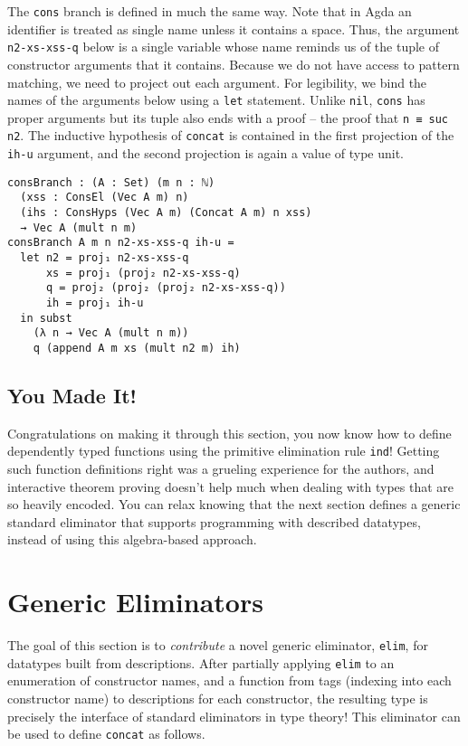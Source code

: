 \documentclass[preprint,nonatbib]{sigplanconf}
\begin{document}
The {\tt cons} branch is defined in much the same way. Note
that in {\sc Agda} an identifier is treated as single name unless it
contains a space. Thus, the argument {\tt n2-xs-xss-q} below is a
single variable whose name reminds us of the tuple of constructor
arguments that it contains. Because we do not have access to pattern
matching, we need to project out each argument. For legibility, we
bind the names of the arguments below using a {\tt let} statement.
Unlike {\tt nil}, {\tt cons} has proper arguments but its tuple also
ends with a proof -- the proof that {\tt n ≡ suc n2}. The inductive
hypothesis of {\tt concat} is contained in the first projection of the
{\tt ih-u} argument, and the second projection is again a value of
type unit.

\begin{verbatim}
consBranch : (A : Set) (m n : ℕ)
  (xss : ConsEl (Vec A m) n)
  (ihs : ConsHyps (Vec A m) (Concat A m) n xss)
  → Vec A (mult n m)
consBranch A m n n2-xs-xss-q ih-u =
  let n2 = proj₁ n2-xs-xss-q
      xs = proj₁ (proj₂ n2-xs-xss-q)
      q = proj₂ (proj₂ (proj₂ n2-xs-xss-q))
      ih = proj₁ ih-u
  in subst
    (λ n → Vec A (mult n m))
    q (append A m xs (mult n2 m) ih)
\end{verbatim}

\subsection{You Made It!}

Congratulations on making it through this section, you now know how to define dependently typed
functions using the primitive elimination rule {\tt ind}!
Getting such function definitions right was a grueling experience for
the authors, and interactive theorem proving doesn't help much when
dealing with types that are so heavily encoded. You can relax knowing
that the next section defines a generic standard eliminator that supports
programming with described datatypes, instead of using this
algebra-based approach.

\section{Generic Eliminators}
\label{sec:elim}

The goal of this section is to {\it contribute} a novel generic
eliminator, {\tt elim}, for datatypes built from descriptions.
After partially applying {\tt elim} to an enumeration of constructor
names, and a function from tags (indexing into each constructor name)
to descriptions for each constructor, the resulting type is precisely
the interface of standard eliminators in type theory!  This eliminator can
be used to define {\tt concat} as follows.
\end{document}
